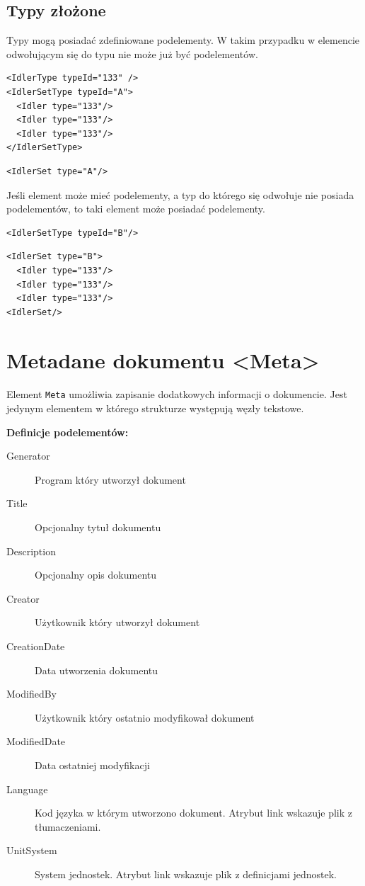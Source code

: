 \documentclass[12pt,a4paper]{article}
\begin{document}
\subsection{Typy złożone}
Typy mogą posiadać zdefiniowane podelementy.  W takim przypadku w elemencie
odwołującym się do typu nie może już być podelementów.

\begin{verbatim}
<IdlerType typeId="133" />
<IdlerSetType typeId="A">
  <Idler type="133"/>
  <Idler type="133"/>
  <Idler type="133"/>
</IdlerSetType>
\end{verbatim}

\begin{verbatim}
<IdlerSet type="A"/>
\end{verbatim}

Jeśli element może mieć podelementy, a typ do którego się odwołuje nie posiada
podelementów, to taki element może posiadać podelementy.

\begin{verbatim}
<IdlerSetType typeId="B"/>
\end{verbatim}

\begin{verbatim}
<IdlerSet type="B">
  <Idler type="133"/>
  <Idler type="133"/>
  <Idler type="133"/>
<IdlerSet/>
\end{verbatim}

\section{Metadane dokumentu <Meta>}
Element {\tt Meta} umożliwia zapisanie dodatkowych informacji o dokumencie.
Jest jedynym elementem w którego strukturze występują węzły tekstowe.

\noindent\textbf{Definicje podelementów:}
\begin{description}
\item[Generator] Program który utworzył dokument
\item[Title] Opcjonalny tytuł dokumentu
\item[Description] Opcjonalny opis dokumentu
\item[Creator] Użytkownik który utworzył dokument
\item[CreationDate] Data utworzenia dokumentu
\item[ModifiedBy] Użytkownik który ostatnio modyfikował dokument
\item[ModifiedDate] Data ostatniej modyfikacji
\item[Language] Kod języka w którym utworzono dokument.
	Atrybut link wskazuje plik z tłumaczeniami.
\item[UnitSystem] System jednostek. Atrybut link wskazuje plik z definicjami jednostek. 
\end{description}
\end{document}
